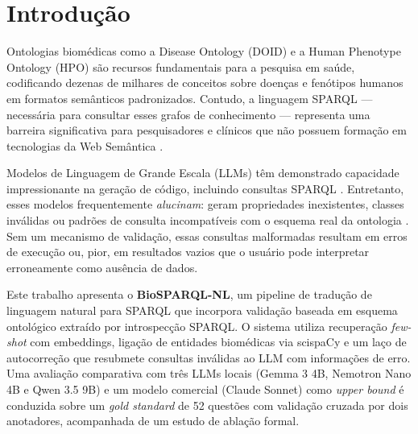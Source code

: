 \documentclass[12pt]{article}
\begin{document}
\section{Introdu\c{c}\~{a}o}
\label{sec:intro}

Ontologias biom\'{e}dicas como a Disease Ontology (DOID) \cite{schriml2022doid} e a Human Phenotype Ontology (HPO) \cite{kohler2021hpo} s\~{a}o recursos fundamentais para a pesquisa em sa\'{u}de, codificando dezenas de milhares de conceitos sobre doen\c{c}as e fen\'{o}tipos humanos em formatos sem\^{a}nticos padronizados. Contudo, a linguagem SPARQL --- necess\'{a}ria para consultar esses grafos de conhecimento --- representa uma barreira significativa para pesquisadores e cl\'{i}nicos que n\~{a}o possuem forma\c{c}\~{a}o em tecnologias da Web Sem\^{a}ntica \cite{hogan2021knowledge}.

Modelos de Linguagem de Grande Escala (LLMs) t\^{e}m demonstrado capacidade impressionante na gera\c{c}\~{a}o de c\'{o}digo, incluindo consultas SPARQL \cite{pan2024unifying}. Entretanto, esses modelos frequentemente \textit{alucinam}: geram propriedades inexistentes, classes inv\'{a}lidas ou padr\~{o}es de consulta incompat\'{i}veis com o esquema real da ontologia \cite{manda2025llms}. Sem um mecanismo de valida\c{c}\~{a}o, essas consultas malformadas resultam em erros de execu\c{c}\~{a}o ou, pior, em resultados vazios que o usu\'{a}rio pode interpretar erroneamente como aus\^{e}ncia de dados.

Este trabalho apresenta o \textbf{BioSPARQL-NL}, um pipeline de tradu\c{c}\~{a}o de linguagem natural para SPARQL que incorpora valida\c{c}\~{a}o baseada em esquema ontol\'{o}gico extra\'{i}do por introspec\c{c}\~{a}o SPARQL. O sistema utiliza recupera\c{c}\~{a}o \textit{few-shot} com embeddings, liga\c{c}\~{a}o de entidades biom\'{e}dicas via scispaCy \cite{neumann2019scispacy} e um la\c{c}o de autocorre\c{c}\~{a}o que resubmete consultas inv\'{a}lidas ao LLM com informa\c{c}\~{o}es de erro. Uma avalia\c{c}\~{a}o comparativa com tr\^{e}s LLMs locais (Gemma 3 4B, Nemotron Nano 4B e Qwen 3.5 9B) e um modelo comercial (Claude Sonnet) como \textit{upper bound} \'{e} conduzida sobre um \textit{gold standard} de 52 quest\~{o}es com valida\c{c}\~{a}o cruzada por dois anotadores, acompanhada de um estudo de abla\c{c}\~{a}o formal.
\end{document}

